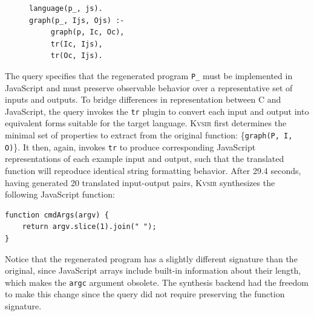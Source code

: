 \documentclass[sigplan,review,anonymous,10pt]{acmart}
\newcommand{\sys}{{\scshape Kv{\textalpha}sir}\xspace}
\newcommand{\ttt}[1]{\texttt{#1}\xspace}
\newcommand{\prop}[1]{\setlength{\fboxsep}{1.75pt}\colorbox{lightperiwinkle}{\texttt{#1}}}
\begin{document}
\begin{figure}
\begin{verbatim}
language(p_, js).
graph(p_, Ijs, Ojs) :-
     graph(p, Ic, Oc),
     tr(Ic, Ijs),
     tr(Oc, Ijs).
\end{verbatim}
\end{figure}
The query specifies that the regenerated program \texttt{P\_} must be
implemented in JavaScript and must preserve observable behavior over a
representative set of inputs and outputs.
To bridge differences in
representation between C and JavaScript, the query invokes the \ttt{tr} plugin
to convert each input and output into equivalent forms suitable for the target language.
\sys first determines the minimal set of properties to extract from the
original function: \{\prop{graph(P, I, O)}\}.
It then, again, invokes \ttt{tr} to produce
corresponding JavaScript representations of each example input and output, such
that the translated function will reproduce identical string formatting
behavior.
After 29.4 seconds, having generated 20 translated input-output pairs, \sys synthesizes the following JavaScript function:

\begin{verbatim}
function cmdArgs(argv) {
    return argv.slice(1).join(" ");
}
\end{verbatim}
Notice that the regenerated program has a slightly different signature than the original, 
since JavaScript arrays include built-in information about their length,
which makes the \ttt{argc} argument obsolete.
The synthesis backend had the freedom to make this change since the query did not require preserving
the function signature.
\end{document}

